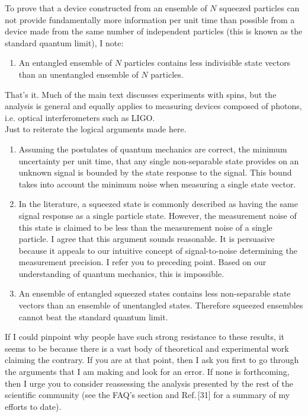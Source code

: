 \documentclass[reqno]{amsart}
\begin{document}
To prove that a device constructed from an ensemble of $N$ squeezed particles can not provide fundamentally more information per unit time than possible from a device made from the same number of independent particles (this is known as the standard quantum limit), I note:
\begin{enumerate}
\item An entangled ensemble of $N$ particles contains less indivisible state vectors than an unentangled ensemble of $N$ particles.
\end{enumerate}
That's it. Much of the main text discusses experiments with spins, but the analysis is general and equally applies to measuring devices composed of photons, i.e. optical interferometers such as LIGO.\\

Just to reiterate the logical arguments made here.
\begin{enumerate}
\item Assuming the postulates of quantum mechanics are correct, the minimum uncertainty per unit time, that any single non-separable state provides on an unknown signal is bounded by the state response to the signal. This bound takes into account the minimum noise when measuring a single state vector.
\item In the literature, a squeezed state is commonly described as having the same signal response as a single particle state. However, the measurement noise of this state is claimed to be less than the measurement noise of a single particle. I agree that this argument sounds reasonable. It is persuasive because it appeals to our intuitive concept of signal-to-noise determining the measurement precision. I refer you to preceding point. Based on our understanding of quantum mechanics, this is impossible.
\item An ensemble of entangled squeezed states contains less non-separable state vectors than an ensemble of unentangled states. Therefore squeezed ensembles cannot beat the standard quantum limit.\\
\end{enumerate}

If I could pinpoint why people have such strong resistance to these results, it seems to be because there is a vast body of theoretical and experimental work claiming the contrary. If you are at that point, then I ask you first to go through the arguments that I am making and look for an error. If none is forthcoming, then I urge you to consider reassessing the analysis presented by the rest of the scientific community (see the FAQ's section and Ref.\,[\textcolor{blue!50!black}{31}] for a summary of my efforts to date).
\end{document}
